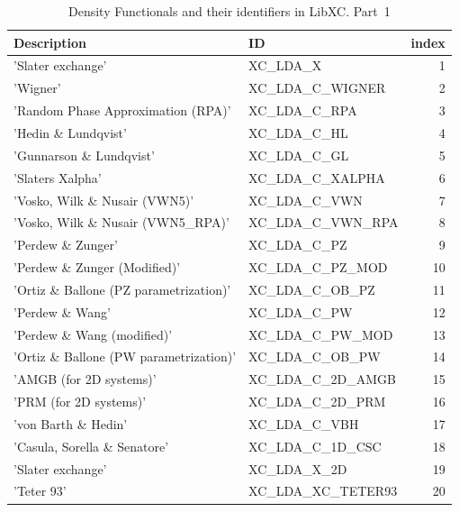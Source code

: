 \documentclass[final,12pt,makeidx,DIV=calc]{article}
\begin{document}
{{{{{{\begin{table}[hbt]
\caption{\label{tab:libxc1}Density Functionals and their identifiers
  in LibXC. Part~1}
\begin{center}
\begin{tabular}{llr}
\hline
\hline
Description & ID & index\\
\hline
  'Slater exchange' & XC\_LDA\_X  &  1\\
  'Wigner' & XC\_LDA\_C\_WIGNER  &  2\\
  'Random Phase Approximation (RPA)' & XC\_LDA\_C\_RPA  &  3\\
  'Hedin \& Lundqvist' & XC\_LDA\_C\_HL  &  4\\
  'Gunnarson \& Lundqvist' & XC\_LDA\_C\_GL  &  5\\
  'Slaters Xalpha' & XC\_LDA\_C\_XALPHA  &  6\\
  'Vosko, Wilk \& Nusair (VWN5)' & XC\_LDA\_C\_VWN  &  7\\
  'Vosko, Wilk \& Nusair (VWN5\_RPA)' & XC\_LDA\_C\_VWN\_RPA  &  8\\
  'Perdew \& Zunger' & XC\_LDA\_C\_PZ  &  9\\
  'Perdew \& Zunger (Modified)' & XC\_LDA\_C\_PZ\_MOD  & 10\\
  'Ortiz \& Ballone (PZ parametrization)' & XC\_LDA\_C\_OB\_PZ  & 11\\
  'Perdew \& Wang' & XC\_LDA\_C\_PW  & 12\\
  'Perdew \& Wang (modified)' & XC\_LDA\_C\_PW\_MOD  & 13\\
  'Ortiz \& Ballone (PW parametrization)' & XC\_LDA\_C\_OB\_PW  & 14\\
  'AMGB (for 2D systems)' & XC\_LDA\_C\_2D\_AMGB  & 15\\
  'PRM (for 2D systems)' & XC\_LDA\_C\_2D\_PRM  & 16\\
  'von Barth \& Hedin' & XC\_LDA\_C\_VBH  & 17\\
  'Casula, Sorella \& Senatore' & XC\_LDA\_C\_1D\_CSC  & 18\\
  'Slater exchange' & XC\_LDA\_X\_2D  & 19\\
  'Teter 93' & XC\_LDA\_XC\_TETER93  & 20\\
\hline
\hline
\end{tabular}
\end{center}
\end{table}


}}}}}}
\end{document}
